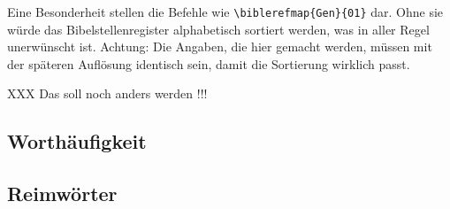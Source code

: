 Eine Besonderheit stellen die Befehle wie \lstinline/\biblerefmap{Gen}{01}/ dar.
Ohne sie würde das Bibelstellenregister alphabetisch sortiert werden, was in aller Regel unerwünscht ist.
Achtung: Die Angaben, die hier gemacht werden, müssen mit der späteren Auflösung identisch sein,
damit die Sortierung wirklich passt.

XXX Das soll noch anders werden !!!

\subsection{Worthäufigkeit}

\subsection{Reimwörter}

